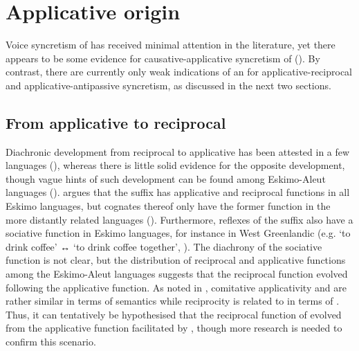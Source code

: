 \section{Applicative origin} \label{diachrony:applicative}
Voice syncretism of  has received minimal attention in the literature, yet there appears to be some evidence for causative-applicative syncretism of  (). By contrast, there are currently only weak indications of an  for applicative-reciprocal and applicative-antipassive syncretism, as discussed in the next two sections.

\subsection{From applicative to reciprocal} \label{diachrony:appl2recp}
Diachronic development from reciprocal to applicative has been attested in a few languages (), whereas there is little solid evidence for the opposite development, though vague hints of such development can be found among Eskimo-Aleut languages (). \citet[841]{fortescue:2007} argues that the  suffix  has applicative and reciprocal functions in all Eskimo languages, but cognates thereof only have the former function in the more distantly related  languages (). Furthermore, reflexes of the suffix also have a sociative function in Eskimo languages, for instance in West Greenlandic (e.g.  ‘to drink coffee’ ↔  ‘to drink coffee together’, \citealt[827]{fortescue:2007}). The diachrony of the sociative function is not clear, but the distribution of reciprocal and applicative functions among the Eskimo-Aleut languages suggests that the reciprocal function evolved following the applicative function. As noted in , comitative applicativity and  are rather similar in terms of semantics while reciprocity is related to  in terms of . Thus, it can tentatively be hypothesised that the reciprocal function of   evolved from the applicative function facilitated by , though more research is needed to confirm this scenario.

